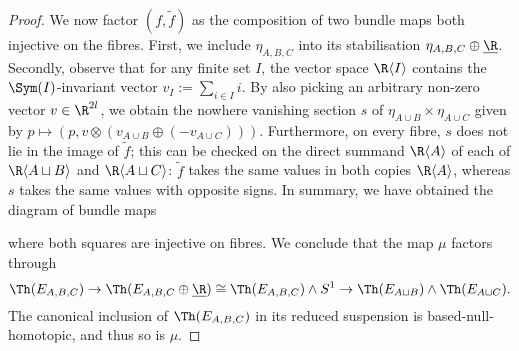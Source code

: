 \begin{proof}
   We now factor $(f,\widetilde{f})$ as the composition of two bundle maps both injective on the fibres. First, we include $\eta_{A,B,C}$ into its stabilisation $\eta_{A,B,C}\oplus \underline{\R}$. Secondly, observe that for any finite set $I$, the vector space $\R\langle I\rangle$ contains the $\Sym(I)$-invariant vector $v_I:=\sum_{i\in I}i$. By also picking an arbitrary non-zero vector $v\in \R^{2l}$, we obtain the nowhere vanishing section $s$ of $\eta_{A\cup B}\times \eta_{A\cup C}$ given by $p\longmapsto (p,v\otimes (v_{A\cup B}\oplus (-v_{A\cup C})))$. Furthermore, on every fibre, $s$ does not lie in the image of $\widetilde{f}$; this can be checked on the direct summand $\R\langle A\rangle$ of each of $\R\langle A\sqcup B\rangle$ and $\R\langle A\sqcup C\rangle$: $\widetilde{f}$ takes the same values in both copies $\R\langle A\rangle$, whereas $s$ takes the same values with opposite signs. In summary, we have obtained the diagram of bundle maps
    \begin{center}
    \end{center}
    where both squares are injective on fibres. We conclude that the map $\mu$ factors through
    \begin{equation*}
        \Th(E_{A,B,C})\to \Th(E_{A,B,C}\oplus \underline{\R})\cong \Th(E_{A,B,C})\wedge S^1\to \Th( E_{A\sqcup B })\wedge\Th(E_{A \sqcup C}).
    \end{equation*}
    The canonical inclusion of $\Th(E_{A,B,C})$ in its reduced suspension is based-null-homotopic, and thus so is $\mu$.
\end{proof}


